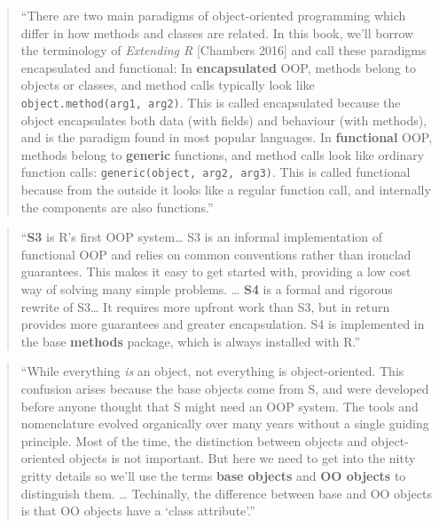 \documentclass[]{tufte-book}
\begin{document}
\begin{quote}
``There are two main paradigms of object-oriented programming which differ in how
methods and classes are related. In this book, we'll borrow the terminology of
\emph{Extending R} {[}Chambers 2016{]} and call these paradigms encapsulated and
functional: In \textbf{encapsulated} OOP, methods belong to objects or classes, and
method calls typically look like \texttt{object.method(arg1,\ arg2)}. This is called
encapsulated because the object encapsulates both data (with fields) and
behaviour (with methods), and is the paradigm found in most popular languages.
In \textbf{functional} OOP, methods belong to \textbf{generic} functions, and method calls
look like ordinary function calls: \texttt{generic(object,\ arg2,\ arg3)}. This is called
functional because from the outside it looks like a regular function call, and
internally the components are also functions.'' \citep{wickham2019advanced}
\end{quote}

\begin{quote}
``\textbf{S3} is R's first OOP system\ldots{} S3 is an informal implementation of functional
OOP and relies on common conventions rather than ironclad guarantees.
This makes it easy to get started with, providing a low cost way of solving many
simple problems. \ldots{} \textbf{S4} is a formal and rigorous rewrite of S3\ldots{}
It requires more upfront work than S3, but in return provides more guarantees and greater
encapsulation. S4 is implemented in the base \textbf{methods} package, which is
always installed with R.'' \citep{wickham2019advanced}
\end{quote}

\begin{quote}
``While everything \emph{is} an object, not everything is object-oriented. This confusion
arises because the base objects come from S, and were developed before anyone
thought that S might need an OOP system. The tools and nomenclature evolved
organically over many years without a single guiding principle. Most of the time,
the distinction between objects and object-oriented objects is not important. But
here we need to get into the nitty gritty details so we'll use the terms
\textbf{base objects} and \textbf{OO objects} to distinguish them. \ldots{} Techinally, the difference
between base and OO objects is that OO objects have a `class attribute'.''
\citep{wickham2019advanced}
\end{quote}
\end{document}
